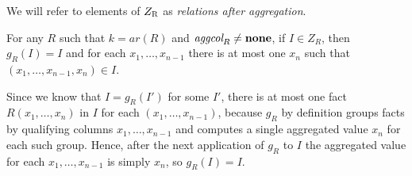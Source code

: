 We will refer to elements of $Z_\textsc{R}$ as \emph{relations after aggregation}.

\begin{lem}\label{lem:fixgr}
For any $R$ such that $k=ar(R)$ and $\textit{aggcol}_R \ne {\bf none}$, if $I \in Z_R$, then $g_R(I) = I$ and for each $x_1, \dots, x_{n-1}$ there is at most one $x_n$ such that $(x_1, \dots, x_{n-1}, x_n) \in I$.
\end{lem}
\begin{prof}
Since we know that $I = g_R(I')$ for some $I'$, there is at most one fact $R(x_1, \dots, x_n)$ in $I$ for each $(x_1, \dots, x_{n-1})$, because $g_R$ by definition groups facts by qualifying columns $x_1, \dots, x_{n-1}$ and computes a single aggregated value $x_n$ for each such group. Hence, after the next application of $g_R$ to $I$ the aggregated value for each $x_1, \dots, x_{n-1}$ is simply $x_n$, so $g_R(I) = I$.
\end{prof}

